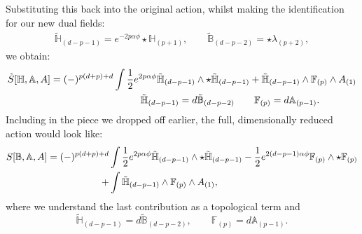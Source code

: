 Substituting this back into the original action, whilst making the identification for our new dual fields:
\begin{equation*}
	\begin{aligned}
		\tilde{\mathbb{H}}_{(d-p-1)} = e^{-2 p \alpha \phi} \star \mathbb{H}_{(p+1)}, \qquad \tilde{\mathbb{B}}_{(d-p-2)} = \star \lambda_{(p+2)},
	\end{aligned}
\end{equation*}
we obtain:
\begin{equation*}
\begin{aligned}
	\tilde{S}[\mathbb{H},\mathbb{A},A] = (-)^{p(d+p)+d} \int \half &e^{2p\alpha \phi} \tilde{\mathbb{H}}_{(d-p-1)} \wedge \star \tilde{\mathbb{H}}_{(d-p-1)} +  \tilde{\mathbb{H}}_{(d-p-1)} \wedge \mathbb{F}_{(p)} \wedge A_{(1)} \\ & \ \ \tilde{\mathbb{H}}_{(d-p-1)} = d\tilde{\mathbb{B}}_{(d-p-2)} \qquad \mathbb{F}_{(p)}  = d\mathbb{A}_{(p-1)}.
\end{aligned}
\end{equation*}
Including in the piece we dropped off earlier, the full, dimensionally reduced action would look like:
\begin{equation}
\begin{aligned}
S[\mathbb{B},\mathbb{A},A] = (-)^{p(d+p)+d} &\int \frac{1}{2} e^{2p\alpha \phi} \tilde{\mathbb{H}}_{(d-p-1)} \wedge \star \tilde{\mathbb{H}}_{(d-p-1)} - \frac{1}{2} e^{2(d-p-1)\alpha \phi}  \mathbb{F}_{(p)} \wedge \star \mathbb{F}_{(p)} \\
	  + &\int \tilde{\mathbb{H}}_{(d-p-1)} \wedge \mathbb{F}_{(p)} \wedge A_{(1)} ,
\end{aligned}
\end{equation}
where we understand the last contribution as a topological term and
\begin{equation*}
	\tilde{\mathbb{H}}_{(d-p-1)} = d\tilde{\mathbb{B}}_{(d-p-2)}, \qquad \mathbb{F}_{(p)}  = d\mathbb{A}_{(p-1)}  .
\end{equation*}

